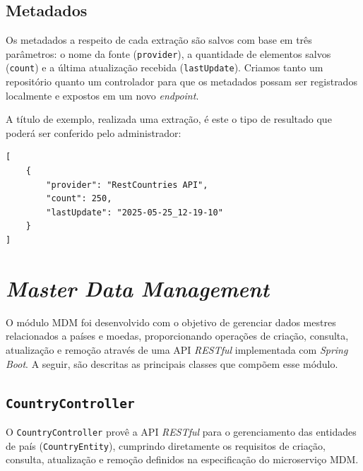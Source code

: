 \documentclass[12pt]{article}
\begin{document}
\subsection{Metadados}
Os metadados a respeito de cada extração são salvos com base em três parâmetros: o nome da fonte (\texttt{provider}), a quantidade de elementos salvos (\texttt{count}) e a última atualização recebida (\texttt{lastUpdate}). Criamos tanto um repositório quanto um controlador para que os metadados possam ser registrados localmente e expostos em um novo \emph{endpoint}.

\quad A título de exemplo, realizada uma extração, é este o tipo de resultado que poderá ser conferido pelo administrador:

\begin{lstlisting}[style=json]
[
    {
        "provider": "RestCountries API",
        "count": 250,
        "lastUpdate": "2025-05-25_12-19-10"
    }
]
\end{lstlisting}

\section{\emph{Master Data Management}}
O módulo MDM foi desenvolvido com o objetivo de gerenciar dados mestres relacionados a países e moedas, proporcionando operações de criação, consulta, atualização e remoção através de uma API \emph{RESTful} implementada com \emph{Spring Boot}. A seguir, são descritas as principais classes que compõem esse módulo.

\subsection{\texttt{CountryController}}
O \texttt{CountryController} provê a API \emph{RESTful} para o gerenciamento das entidades de país (\texttt{CountryEntity}), cumprindo diretamente os requisitos de criação, consulta, atualização e remoção definidos na especificação do microserviço MDM.
\end{document}
